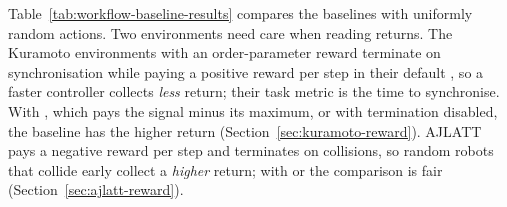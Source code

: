Table~\ref{tab:workflow-baseline-results} compares the baselines with uniformly
random actions. Two environments need care when reading returns. The Kuramoto
environments with an order-parameter reward terminate on synchronisation while
paying a positive reward per step in their default ,
so a faster controller collects \emph{less} return; their task metric is the
time to synchronise. With , which pays the signal
minus its maximum, or with termination disabled, the baseline has the higher
return (Section~\ref{sec:kuramoto-reward}). AJLATT pays a negative reward per
step and terminates on collisions, so random robots that collide early collect
a \emph{higher} return; with  or
 the comparison is fair
(Section~\ref{sec:ajlatt-reward}).

